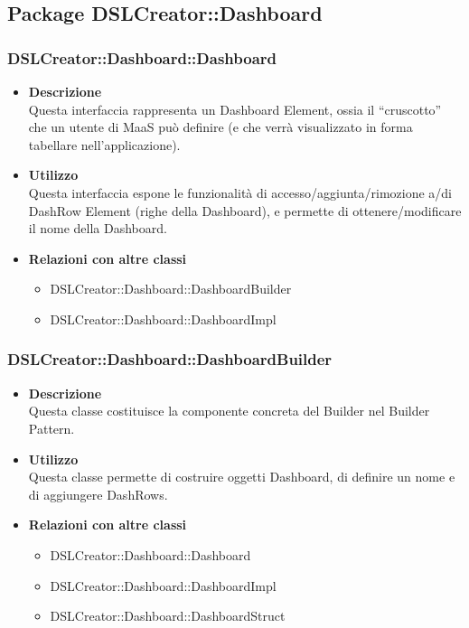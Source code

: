         \subsection{Package DSLCreator::Dashboard}
                \subsubsection{DSLCreator::Dashboard::Dashboard}
                    \begin{itemize}
                        \item \textbf{Descrizione} \hfill \\
                            Questa interfaccia rappresenta un Dashboard Element, ossia il ``cruscotto'' che un utente di MaaS può definire (e che verrà visualizzato in forma tabellare nell'applicazione).
                        \item \textbf{Utilizzo}  \hfill \\
                            Questa interfaccia espone le funzionalità di accesso/aggiunta/rimozione a/di DashRow Element (righe della Dashboard), e permette di ottenere/modificare il nome della Dashboard.
                        \item \textbf{Relazioni con altre classi} \hfill 
                            \begin{itemize}
                              \item DSLCreator::Dashboard::DashboardBuilder
                              \item DSLCreator::Dashboard::DashboardImpl
                            \end{itemize}
                    \end{itemize}

                \subsubsection{DSLCreator::Dashboard::DashboardBuilder}
                    \begin{itemize}
                        \item \textbf{Descrizione} \hfill \\
                            Questa classe costituisce la componente concreta del Builder nel Builder Pattern.
                        \item \textbf{Utilizzo} \hfill \\
                            Questa classe permette di costruire oggetti Dashboard, di definire un nome e di aggiungere DashRows.
                        \item \textbf{Relazioni con altre classi}
                            \begin{itemize}
                              \item DSLCreator::Dashboard::Dashboard
                              \item DSLCreator::Dashboard::DashboardImpl
                              \item DSLCreator::Dashboard::DashboardStruct
                            \end{itemize}
                    \end{itemize}

